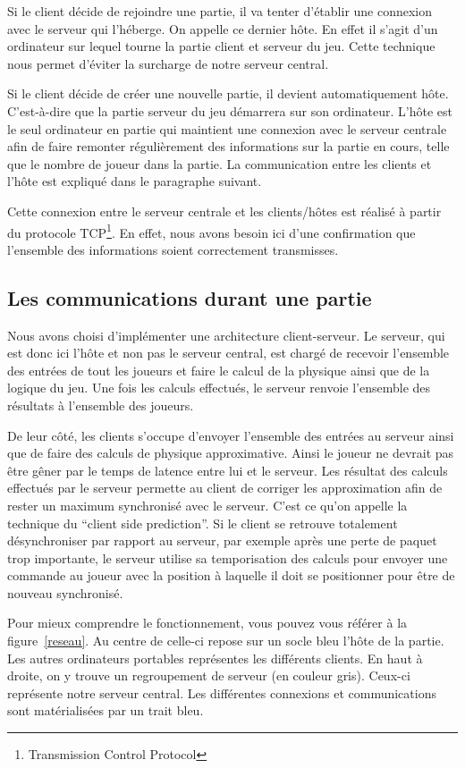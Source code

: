 \documentclass[11pt]{report}
\begin{document}
Si le client décide de rejoindre une partie, il va tenter d'établir une connexion avec le serveur qui l'héberge. On appelle ce dernier hôte. En effet il s'agit d'un ordinateur sur lequel tourne la partie client et serveur du jeu. Cette technique nous permet d'éviter la surcharge de notre serveur central.

Si le client décide de créer une nouvelle partie, il devient automatiquement hôte. C'est-à-dire que la partie serveur du jeu démarrera sur son ordinateur. L'hôte est le seul ordinateur en partie qui maintient une connexion avec le serveur centrale afin de faire remonter régulièrement des informations sur la partie en cours, telle que le nombre de joueur dans la partie. La communication entre les clients et l'hôte est expliqué dans le paragraphe suivant.

Cette connexion entre le serveur centrale et les clients/hôtes est réalisé à partir du protocole TCP\footnote{Transmission Control Protocol}. En effet, nous avons besoin ici d'une confirmation que l'ensemble des informations soient correctement transmisses.

\subsection{Les communications durant une partie}

Nous avons choisi d'implémenter une architecture client-serveur. Le serveur, qui est donc ici l'hôte et non pas le serveur central, est chargé de recevoir l'ensemble des entrées de tout les joueurs et faire le calcul de la physique ainsi que de la logique du jeu. Une fois les calculs effectués, le serveur renvoie l'ensemble des résultats à l'ensemble des joueurs.

De leur côté, les clients s'occupe d'envoyer l'ensemble des entrées au serveur ainsi que de faire des calculs de physique approximative. Ainsi le joueur ne devrait pas être gêner par le temps de latence entre lui et le serveur. Les résultat des calculs effectués par le serveur permette au client de corriger les approximation afin de rester un maximum synchronisé avec le serveur. C'est ce qu'on appelle la technique du ``client side prediction''. Si le client se retrouve totalement désynchroniser par rapport au serveur, par exemple après une perte de paquet trop importante, le serveur utilise sa temporisation des calculs pour envoyer une commande au joueur avec la position à laquelle il doit se positionner pour être de nouveau synchronisé.

Pour mieux comprendre le fonctionnement, vous pouvez vous référer à la figure~\ref{reseau}. Au centre de celle-ci repose sur un socle bleu l'hôte de la partie. Les autres ordinateurs portables représentes les différents clients. En haut à droite, on y trouve un regroupement de serveur (en couleur gris). Ceux-ci représente notre serveur central. Les différentes connexions et communications sont matérialisées par un trait bleu. 
\end{document}
